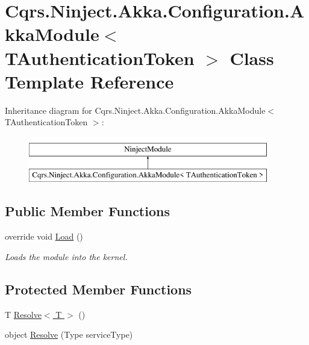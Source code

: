 \hypertarget{classCqrs_1_1Ninject_1_1Akka_1_1Configuration_1_1AkkaModule}{}\section{Cqrs.\+Ninject.\+Akka.\+Configuration.\+Akka\+Module$<$ T\+Authentication\+Token $>$ Class Template Reference}
\label{classCqrs_1_1Ninject_1_1Akka_1_1Configuration_1_1AkkaModule}
Inheritance diagram for Cqrs.\+Ninject.\+Akka.\+Configuration.\+Akka\+Module$<$ T\+Authentication\+Token $>$\+:\begin{figure}[H]
\begin{center}
\leavevmode
\includegraphics[height=2.000000cm]{classCqrs_1_1Ninject_1_1Akka_1_1Configuration_1_1AkkaModule}
\end{center}
\end{figure}
\subsection*{Public Member Functions}
\begin{DoxyCompactItemize}
\item 
override void \hyperlink{classCqrs_1_1Ninject_1_1Akka_1_1Configuration_1_1AkkaModule_ac20ff271987cecce0c8e0d8507adefc0_ac20ff271987cecce0c8e0d8507adefc0}{Load} ()
\begin{DoxyCompactList}\small\item\em Loads the module into the kernel. \end{DoxyCompactList}\end{DoxyCompactItemize}
\subsection*{Protected Member Functions}
\begin{DoxyCompactItemize}
\item 
T \hyperlink{classCqrs_1_1Ninject_1_1Akka_1_1Configuration_1_1AkkaModule_a27665aec43ab831758d85bce822e38d6_a27665aec43ab831758d85bce822e38d6}{Resolve$<$ T $>$} ()
\item 
object \hyperlink{classCqrs_1_1Ninject_1_1Akka_1_1Configuration_1_1AkkaModule_ab5fee79572d239a8bf4e30080c1b8fe8_ab5fee79572d239a8bf4e30080c1b8fe8}{Resolve} (Type service\+Type)
\end{DoxyCompactItemize}


